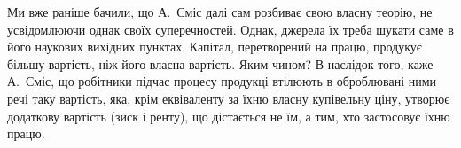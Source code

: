 Ми вже раніше бачили, що А.~Сміс далі сам розбиває свою власну
теорію, не усвідомлюючи однак своїх суперечностей. Однак, джерела їх
треба шукати саме в його наукових вихідних пунктах. Капітал, перетворений
на працю, продукує більшу вартість, ніж його власна вартість.
Яким чином? В наслідок того, каже А.~Сміс, що робітники підчас процесу
продукці втілюють в оброблювані ними речі таку вартість, яка,
крім еквіваленту за їхню власну купівельну ціну, утворює додаткову вартість
(зиск і ренту), що дістається не їм, а тим, хто застосовує їхню працю.
\parbreak{}  %
